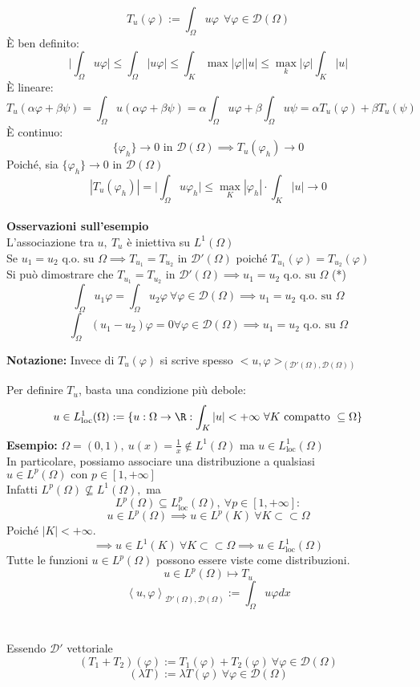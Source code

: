 \[T_u(\varphi):=\int_{\Omega}^{} u\varphi\ \ \forall \varphi\in \mathcal D(\Omega)\]
È ben definito:
\[\bigg| \int_{\Omega}^{} u\varphi\bigg|\le \int_{\Omega}^{} |u\varphi|\le \int_{K}^{} \max |\varphi | |u|\le \max_k|\varphi|\int_{K}^{} |u|  \]  
È lineare:
\[T_u(\alpha\varphi+\beta\psi)=\int_{\Omega}^{} u(\alpha\varphi+\beta\psi)=\alpha \int_{\Omega}^{} u\varphi +\beta \int_{\Omega}^{}u\psi =\alpha T_u(\varphi)+\beta T_u(\psi)   \]
È continuo:
\[\{\varphi_h\} \to 0\text{ in }\mathcal D(\Omega)\implies T_u(\varphi_h)\to 0\]
Poiché, sia $\{\varphi_h\} \to 0\text{ in }\mathcal D(\Omega)$
\[|T_u(\varphi_h)|=\bigg|\int_{\Omega}^{} u\varphi_h \bigg|\le \max_K|\varphi_h|\cdot \int_{K}^{} |u|\to 0\]  
\\\textbf{Osservazioni sull'esempio} 
\\L'associazione tra $u,\ T_u$ è iniettiva su $L^{1}(\Omega)$
\\Se $u_1=u_2\text{ q.o. su }\Omega\implies T_{u_1}=T_{u_2}\text{ in }\mathcal D'(\Omega)$ poiché $T_{u_1}(\varphi)=T_{u_2}(\varphi)$
\\Si può dimostrare che $T_{u_1}=T_{u_2}\text{ in }\mathcal D'(\Omega)\implies u_1=u_2 \text{ q.o. su }\Omega$ (*)
\[\int_{\Omega}^{} u_1\varphi = \int_{\Omega}^{} u_2\varphi\ \forall \varphi\in \mathcal D(\Omega)\implies u_1=u_2\text{ q.o. su } \Omega\] 
\[\int_{\Omega}^{} (u_1-u_2)\varphi =0 \forall \varphi\in \mathcal D(\Omega)\implies u_1=u_2\text{ q.o. su } \Omega\] 
\divider
\begin{tcolorbox}
\textbf{Notazione:} Invece di $T_u(\varphi)$ si scrive spesso $<u,\varphi>_{(\mathcal D'(\Omega), \mathcal D(\Omega))}$
\end{tcolorbox}
Per definire $T_u$, basta una condizione più debole:
\[u\in L^1_{\text{loc}}(\Omega):=\{u:\Omega\to \R: \int_{K}^{} |u|<+\infty\ \forall K\text{ compatto }\subseteq  \Omega \}\]
\textbf{Esempio:} $\Omega=(0,1),\ u(x)=\frac{1}{x}\not\in L^1(\Omega)$ ma $u\in L^1_{\text{loc}}(\Omega)$
\\In particolare, possiamo associare una distribuzione a qualsiasi $u\in L^{p}(\Omega)\text{ con } p \in [1,+\infty]$ 
\\Infatti $L^{p}(\Omega)\not \subseteq  L^1(\Omega), $ ma 
\[L^{p}(\Omega)\subseteq  L^p_{\text{loc}}(\Omega),\ \forall  p \in [1,+\infty]:\]
\[u\in L^{p}(\Omega)\implies u\in L^{p}(K)\ \forall K \subset \subset \Omega\]
Poiché $|K|<+\infty$.
\[\implies u \in L^{1}(K)\ \forall K \subset  \subset \Omega \implies u\in L_{\text{loc}}^1(\Omega)\]
Tutte le funzioni $u\in L^{p}(\Omega)$ possono essere viste come distribuzioni.
\[u\in L^{p}(\Omega)\mapsto T_u\]
\[\left<u,\varphi \right>_{\mathcal D'(\Omega), \mathcal D(\Omega)}:=\int_{\Omega}^{} u\varphi dx\]
\divider\\
\\Essendo $\mathcal D'$ vettoriale
\[(T_1+T_2)(\varphi):=T_1(\varphi)+T_2(\varphi)\ \forall \varphi\in \mathcal D(\Omega)\]
\[(\lambda T):=\lambda T(\varphi) \ \forall \varphi \in \mathcal D(\Omega)\]

